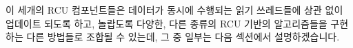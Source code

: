 이 세개의 RCU 컴포넌트들은 데이터가 동시에 수행되는 읽기 쓰레드들에 상관 없이
업데이트 되도록 하고, 놀랍도록 다양한, 다른 종류의 RCU 기반의 알고리즘들을
구현하는 다른 방법들로 조합될 수 있는데, 그 중 일부는 다음 섹션에서
설명하겠습니다.

